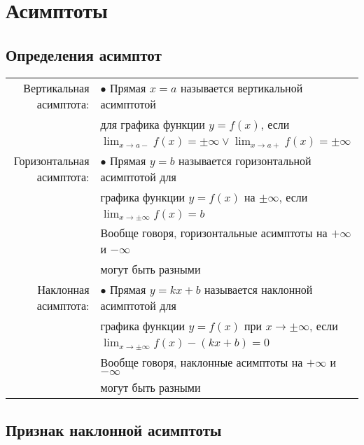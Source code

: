 \chapter{Асимптоты}

\section{Определения асимптот}

{
\begin{tabular}{rl}
    Вертикальная асимптота:   & $\bullet$ Прямая $ x = a $ называется вертикальной асимптотой \\
                              & для графика функции $y=f(x)$, если \\
                              & $ \lim_{x \to a-} f(x) = \pm \infty \vee \lim_{x \to a+} f(x) = \pm \infty $ \\
    Горизонтальная асимптота: & $\bullet$ Прямая $y=b$ называется горизонтальной асимптотой для \\
                              & графика функции $y=f(x)$ на $\pm\infty$, если \\
                              & $ \lim_{x \to \pm\infty} f(x) = b $ \\
                              & Вообще говоря, горизонтальные асимптоты на $+\infty$ и $-\infty$ \\
                              & могут быть разными \\
    Наклонная асимптота:      & $\bullet$ Прямая $y=kx + b$ называется наклонной асимптотой для \\
                              & графика функции $y=f(x)$ при $x \to \pm\infty$, если \\
                              & $ \lim_{x \to \pm\infty} f(x) - (kx + b) = 0 $ \\
                              & Вообще говоря, наклонные асимптоты на $+\infty$ и $-\infty$ \\
                              & могут быть разными \\
\end{tabular}
}

\section{Признак наклонной асимптоты}

